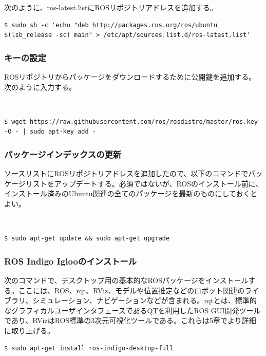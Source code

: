 次のように、ros-latest.listにROSリポジトリアドレスを追加する。

\begin{lstlisting}[language=ROS]
$ sudo sh -c 'echo "deb http://packages.ros.org/ros/ubuntu $(lsb_release -sc) main" > /etc/apt/sources.list.d/ros-latest.list'
\end{lstlisting}

\subsubsection{キーの設定}

ROSリポジトリからパッケージをダウンロードするために公開鍵を追加する。次のように入力する。

\\
\begin{lstlisting}[language=ROS]
$ wget https://raw.githubusercontent.com/ros/rosdistro/master/ros.key -O - | sudo apt-key add -
\end{lstlisting}

\subsubsection{パッケージインデックスの更新}

ソースリストにROSリポジトリアドレスを追加したので、以下のコマンドでパッケージリストをアップデートする。必須ではないが、ROSのインストール前に、インストール済みのUbuntu関連の全てのパッケージを最新のものにしておくとよい。

\\
\begin{lstlisting}[language=ROS]
$ sudo apt-get update && sudo apt-get upgrade
\end{lstlisting}

\subsubsection{ROS Indigo Iglooのインストール}

次のコマンドで、デスクトップ用の基本的なROSパッケージをインストールする。ここには、ROS、rqt、RViz、モデルや位置推定などのロボット関連のライブラリ、シミュレーション、ナビゲーションなどが含まれる。rqtとは、標準的なグラフィカルユーザインタフェースであるQTを利用したROS GUI開発ツールであり、RVizはROS標準の3次元可視化ツールである。これらは5章でより詳細に取り上げる。

\begin{lstlisting}[language=ROS]
$ sudo apt-get install ros-indigo-desktop-full
\end{lstlisting}

